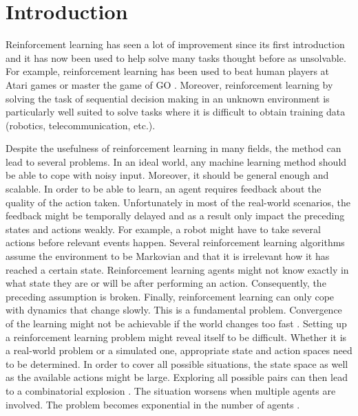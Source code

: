 \chapter{Introduction}
Reinforcement learning has seen a lot of improvement since its first introduction and it has now been used to help solve many tasks thought before as unsolvable. For example, reinforcement learning has been used to beat human players at Atari games \cite{mnih_playing_2013} or master the game of GO \cite{silver_mastering_2016}. Moreover, reinforcement learning by solving the task of sequential decision making in an unknown environment is particularly well suited to solve tasks where it is difficult to obtain training data (robotics, telecommunication, etc.). 


Despite the usefulness of reinforcement learning in many fields, the method can lead to several problems. In an ideal world, any machine learning method should be able to cope with noisy input. Moreover, it should be general enough and scalable. In order to be able to learn, an agent requires feedback about the quality of the action taken. Unfortunately in most of the real-world scenarios, the feedback might be temporally delayed and as a result only impact the preceding states and actions weakly. For example, a robot might have to take several actions before relevant events happen. Several reinforcement learning algorithms assume the environment to be Markovian and that it is irrelevant how it has reached a certain state. Reinforcement learning agents might not know exactly in what state they are or will be after performing an action. Consequently, the preceding assumption is broken. Finally, reinforcement learning can only cope with dynamics that change slowly. This is a fundamental problem. Convergence of the learning might not be achievable if the world changes too fast \cite{kaelbling_reinforcement_1996}. Setting up a reinforcement learning problem might reveal itself to be difficult. Whether it is a real-world problem or a simulated one, appropriate state and action spaces need to be determined. In order to cover all possible situations, the state space as well as the available actions might be large. Exploring all possible pairs can then lead to a combinatorial explosion \cite{busoniu_comprehensive_2008, busoniu_multi-agent_2010}. The situation worsens when multiple agents are involved. The problem becomes exponential in the number of agents \cite{l._leottau_decentralized_2017}.

